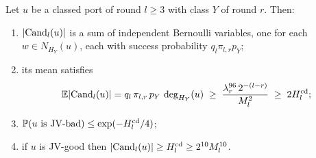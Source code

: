 \begin{lemma}\label{s7:lemCand}
Let $u$ be a classed port of round $l\ge3$ with class $Y$ of round $r$. Then:
\begin{enumerate}
\item[(i)] $|\mathrm{Cand}_l(u)|$ is a sum of independent Bernoulli variables, one for
each $w\in N_{H_Y}(u)$, each with success probability $q_l\pi_{l,r}p_Y$;
\item[(ii)] its mean satisfies
\[
\mathbb{E}|\mathrm{Cand}_l(u)|=q_l\,\pi_{l,r}\,p_Y\,\deg_{H_Y}(u)
\;\ge\;\frac{\lambda_r^{96}\,2^{-(l-r)}}{M_l^{2}}
\;\ge\;2H^{\mathrm{cd}}_l ;
\]
\item[(iii)] $\mathbb{P}(u\text{ is JV-bad})\le\exp(-H^{\mathrm{cd}}_l/4)$;
\item[(iv)] if $u$ is JV-good then $|\mathrm{Cand}_l(u)|\ge H^{\mathrm{cd}}_l\ge2^{10}M_l^{10}$.
\end{enumerate}
\deps{\ref{s7:defCand}, \ref{s7:defPool}, \ref{s3:defCOL}, \ref{s3:lemCOLJV}, \ref{s2:propStructure}, \ref{s2:lemTower}, \ref{s1:citChernoffGen}}
\end{lemma}

